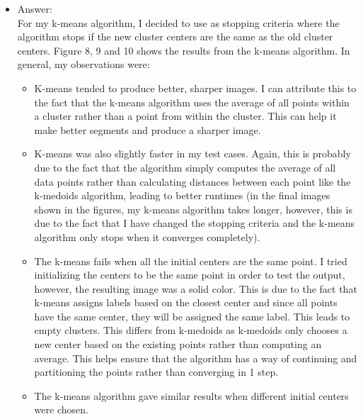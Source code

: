 \documentclass[twoside,10pt]{article}
\begin{document}
\begin{enumerate}
  \begin{itemize}
  \item Answer:\\
  For my k-means algorithm, I decided to use as stopping criteria where the algorithm stops if the new cluster centers are the same as the old cluster centers. Figure 8, 9 and 10 shows the results from the k-means algorithm. In general, my observations were:
  \begin{itemize}
  \item K-means tended to produce better, sharper images. I can attribute this to the fact that the k-means algorithm uses the average of all points within a cluster rather than a point from within the cluster. This can help it make better segments and produce a sharper image.
  \item K-means was also slightly faster in my test cases. Again, this is probably due to the fact that the algorithm simply computes the average of all data points rather than calculating distances between each point like the k-medoids algorithm, leading to better runtimes (in the final images shown in the figures, my k-means algorithm takes longer, however, this is due to the fact that I have changed the stopping criteria and the k-means algorithm only stops when it converges completely).
  \item The k-means fails when all the initial centers are the same point. I tried initializing the centers to be the same point in order to test the output, however, the resulting image was a solid color. This is due to the fact that k-means assigns labels based on the closest center and since all points have the same center, they will be assigned the same label. This leads to empty clusters. This differs from k-medoids as k-medoids only chooses a new center based on the existing points rather than computing an average. This helps ensure that the algorithm has a way of continuing and partitioning the points rather than converging in 1 step.
  \item The k-means algorithm gave similar results when different initial centers were chosen. 
  \end{itemize}
  

\end{itemize}
\end{enumerate}
\end{document}
